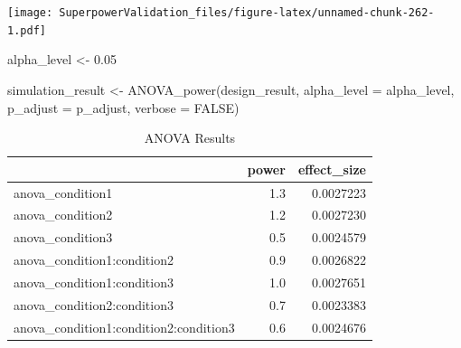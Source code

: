 \documentclass[
]{book}
\newenvironment{Shaded}{\begin{snugshade}}{\end{snugshade}}
\newcommand{\AttributeTok}[1]{\textcolor[rgb]{0.77,0.63,0.00}{#1}}
\newcommand{\ConstantTok}[1]{\textcolor[rgb]{0.00,0.00,0.00}{#1}}
\newcommand{\FloatTok}[1]{\textcolor[rgb]{0.00,0.00,0.81}{#1}}
\newcommand{\FunctionTok}[1]{\textcolor[rgb]{0.00,0.00,0.00}{#1}}
\newcommand{\NormalTok}[1]{#1}
\newcommand{\OtherTok}[1]{\textcolor[rgb]{0.56,0.35,0.01}{#1}}
\begin{document}
\texttt{[image: SuperpowerValidation\_files/figure-latex/unnamed-chunk-262-1.pdf]}

\begin{Shaded}
\begin{Highlighting}[]
\NormalTok{alpha\_level }\OtherTok{\textless{}{-}} \FloatTok{0.05}
\end{Highlighting}
\end{Shaded}

\begin{Shaded}
\begin{Highlighting}[]
\NormalTok{simulation\_result }\OtherTok{\textless{}{-}} \FunctionTok{ANOVA\_power}\NormalTok{(design\_result, }
                                 \AttributeTok{alpha\_level =}\NormalTok{ alpha\_level,}
                                 \AttributeTok{p\_adjust =}\NormalTok{ p\_adjust,}
                                 \AttributeTok{verbose =} \ConstantTok{FALSE}\NormalTok{)}
\end{Highlighting}
\end{Shaded}

\begin{table}[!h]

\caption{\label{tab:unnamed-chunk-264}ANOVA Results}
\centering
\begin{tabular}[t]{l|r|r}
\hline
  & power & effect\_size\\
\hline
anova\_condition1 & 1.3 & 0.0027223\\
\hline
anova\_condition2 & 1.2 & 0.0027230\\
\hline
anova\_condition3 & 0.5 & 0.0024579\\
\hline
anova\_condition1:condition2 & 0.9 & 0.0026822\\
\hline
anova\_condition1:condition3 & 1.0 & 0.0027651\\
\hline
anova\_condition2:condition3 & 0.7 & 0.0023383\\
\hline
anova\_condition1:condition2:condition3 & 0.6 & 0.0024676\\
\hline
\end{tabular}
\end{table}
\end{document}
